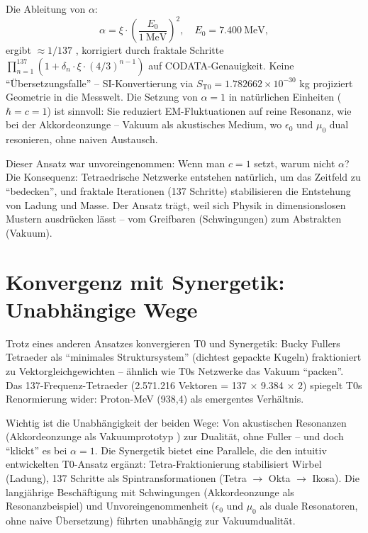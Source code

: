 	Die Ableitung von $\alpha$:
	\begin{equation}
		\alpha = \xi \cdot \left( \frac{E_0}{1\ \mathrm{MeV}} \right)^2, \quad E_0 = 7.400\ \mathrm{MeV},
	\end{equation}
	ergibt $\approx 1/137$ \cite{codata2022}, korrigiert durch fraktale Schritte $\prod_{n=1}^{137} (1 + \delta_n \cdot \xi \cdot (4/3)^{n-1})$ auf CODATA-Genauigkeit. Keine ``Übersetzungsfalle'' – SI-Konvertierung via $S_{\mathrm{T0}} = 1.782662 \times 10^{-30}$ kg projiziert Geometrie in die Messwelt. Die Setzung von $\alpha = 1$ in natürlichen Einheiten ($\hbar = c = 1$) ist sinnvoll: Sie reduziert EM-Fluktuationen auf reine Resonanz, wie bei der Akkordeonzunge \cite{ricot2005} – Vakuum als akustisches Medium, wo $\epsilon_0$ und $\mu_0$ dual resonieren, ohne naiven Austausch.
	
	Dieser Ansatz war unvoreingenommen: Wenn man $c = 1$ setzt, warum nicht $\alpha$? Die Konsequenz: Tetraedrische Netzwerke entstehen natürlich, um das Zeitfeld zu ``bedecken'', und fraktale Iterationen (137 Schritte) stabilisieren die Entstehung von Ladung und Masse. Der Ansatz trägt, weil sich Physik in dimensionslosen Mustern ausdrücken lässt – vom Greifbaren (Schwingungen) zum Abstrakten (Vakuum).
	
	\section{Konvergenz mit Synergetik: Unabhängige Wege}
	Trotz eines anderen Ansatzes konvergieren T0 und Synergetik: Bucky Fullers Tetraeder als ``minimales Struktursystem'' \cite{fuller1975} (dichtest gepackte Kugeln) fraktioniert zu Vektorgleichgewichten – ähnlich wie T0s Netzwerke das Vakuum ``packen''. Das 137-Frequenz-Tetraeder (2.571.216 Vektoren = 137 $\times$ 9.384 $\times$ 2) spiegelt T0s Renormierung wider: Proton-MeV (938,4) als emergentes Verhältnis.
	
	Wichtig ist die Unabhängigkeit der beiden Wege: Von akustischen Resonanzen (Akkordeonzunge als Vakuumprototyp \cite{ricot2005}) zur Dualität, ohne Fuller – und doch ``klickt'' es bei $\alpha=1$. Die Synergetik bietet eine Parallele, die den intuitiv entwickelten T0-Ansatz ergänzt: Tetra-Fraktionierung stabilisiert Wirbel (Ladung), 137 Schritte als Spintransformationen (Tetra $\to$ Okta $\to$ Ikosa). Die langjährige Beschäftigung mit Schwingungen (Akkordeonzunge als Resonanzbeispiel) und Unvoreingenommenheit ($\epsilon_0$ und $\mu_0$ als duale Resonatoren, ohne naive Übersetzung) führten unabhängig zur Vakuumdualität.
	
